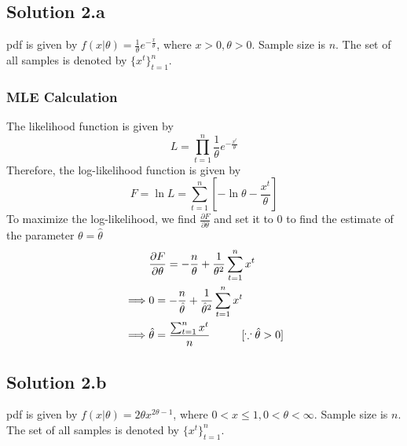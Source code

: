 \subsection*{Solution 2.a}
pdf is given by $f(x|\theta) = \frac{1}{\theta}e^{-\frac{x}{\theta}}$, where $x > 0, \theta > 0$. Sample size is $n$. The set of all samples is denoted by $\{x^t\}_{t=1}^n$.
\subsubsection*{MLE Calculation}
The likelihood function is given by
\begin{equation*}
	L = \prod_{t=1}^n \frac{1}{\theta}e^{-\frac{x^t}{\theta}}
\end{equation*}
Therefore, the log-likelihood function is given by
\begin{equation*}
F = \ln L = \sum_{t=1}^n \left[-\ln \theta - \frac{x^t}{\theta} \right]
\end{equation*}
To maximize the log-likelihood, we find $\frac{\partial F}{\partial \theta}$ and set it to $0$ to find the estimate of the parameter $\theta = \hat{\theta}$
\begin{equation*}
	\begin{split}
		& \frac{\partial F}{\partial \theta} = - \frac{n}{\theta} + \frac{1}{\theta^2} \sum_{t=1}^n x^t\\
		\implies & 0 = -\frac{n}{\hat{\theta}} + \frac{1}{\hat{\theta}^2} \sum_{t=1}^n x^t\\
		\implies & \hat{\theta} = \frac{\sum_{t=1}^n x^t}{n} \hspace*{1cm} [\because \hat{\theta} > 0]
	\end{split}
\end{equation*}
\subsection*{Solution 2.b}
pdf is given by $f(x|\theta) = 2\theta x^{2\theta -1}$, where $0 < x \leq 1, 0 < \theta < \infty$. Sample size is $n$. The set of all samples is denoted by $\{x^t\}_{t=1}^n$.
